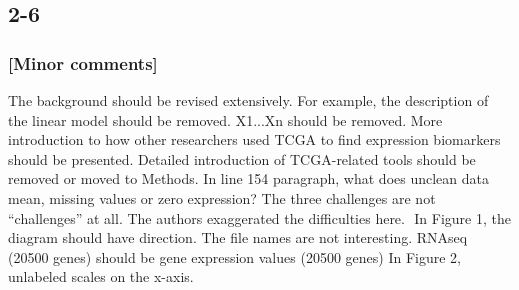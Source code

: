 \documentclass[preprint,12pt]{elsarticle}
\newenvironment{MyColorPar}[1]{%
    \leavevmode\color{#1}\ignorespaces%
}{%
}%
\begin{document}
\begin{MyColorPar}{blue}
 


\end{MyColorPar}
%
\clearpage

\subsection*{2-6}
\subsubsection*{[Minor comments]}
The background should be revised extensively. For example, the description of the linear model should be removed. X1...Xn should be removed. 
More introduction to how other researchers used TCGA to find expression biomarkers should be presented. 
Detailed introduction of TCGA-related tools should be removed or moved to Methods.
In line 154 paragraph, what does unclean data mean, missing values or zero expression? The three challenges are not “challenges” at all. The authors exaggerated the difficulties here. 
In Figure 1, the diagram should have direction. 
The file names are not interesting. RNAseq (20500 genes) should be gene expression values (20500 genes)
In Figure 2, unlabeled scales on the x-axis.
\end{document}
